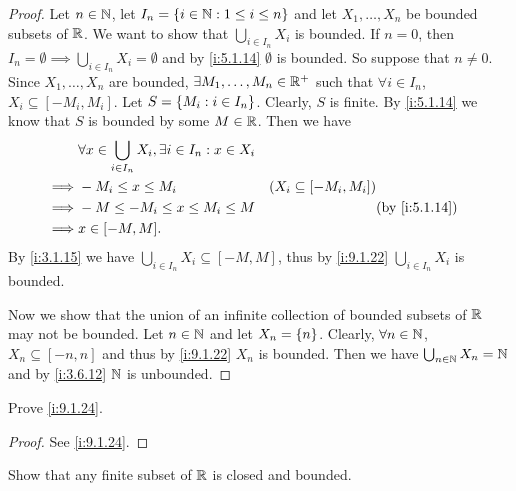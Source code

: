 \begin{proof}
  Let \(n \in \mathbb{N}\), let \(I_n = \left\lbrace i \in \mathbb{N} : 1 \leq i \leq n\right\rbrace\) and let \(X_1, \dots, X_n\) be bounded subsets of \(\mathbb{R}\).
  We want to show that \(\bigcup_{i \in I_n} X_i\) is bounded.
  If \(n = 0\), then \(I_n = \emptyset \implies \bigcup_{i \in I_n} X_i = \emptyset\) and by \cref{i:5.1.14} \(\emptyset\) is bounded.
  So suppose that \(n \neq 0\).
  Since \(X_1, \dots, X_n\) are bounded, \(\exists M_1, \dots, M_n \in \mathbb{R}^+\) such that \(\forall i \in I_n\), \(X_i \subseteq [-M_i, M_i]\).
  Let \(S = \left\lbrace M_i : i \in I_n\right\rbrace\).
  Clearly, \(S\) is finite.
  By \cref{i:5.1.14} we know that \(S\) is bounded by some \(M \in \mathbb{R}\).
  Then we have
  \begin{align*}
             & \forall x \in \bigcup_{i \in I_n} X_i, \exists i \in I_n : x \in X_i                                               \\
    \implies & -M_i \leq x \leq M_i                                                 & (X_i \subseteq [-M_i, M_i])                 \\
    \implies & -M \leq -M_i \leq x \leq M_i \leq M                                  &                             & \by{i:5.1.14} \\
    \implies & x \in [-M, M].
  \end{align*}
  By \cref{i:3.1.15} we have \(\bigcup_{i \in I_n} X_i \subseteq [-M, M]\), thus by \cref{i:9.1.22} \(\bigcup_{i \in I_n} X_i\) is bounded.

  Now we show that the union of an infinite collection of bounded subsets of \(\mathbb{R}\) may not be bounded.
  Let \(n \in \mathbb{N}\) and let \(X_n = \left\lbrace n\right\rbrace\).
  Clearly, \(\forall n \in \mathbb{N}\), \(X_n \subseteq [-n, n]\) and thus by \cref{i:9.1.22} \(X_n\) is bounded.
  Then we have \(\bigcup_{n \in \mathbb{N}} X_n = \mathbb{N}\) and by \cref{i:3.6.12} \(\mathbb{N}\) is unbounded.
\end{proof}

\begin{ex}\label{i:ex:9.1.13}
  Prove \cref{i:9.1.24}.
\end{ex}

\begin{proof}
  See \cref{i:9.1.24}.
\end{proof}

\begin{ex}\label{i:ex:9.1.14}
  Show that any finite subset of \(\mathbb{R}\) is closed and bounded.
\end{ex}

